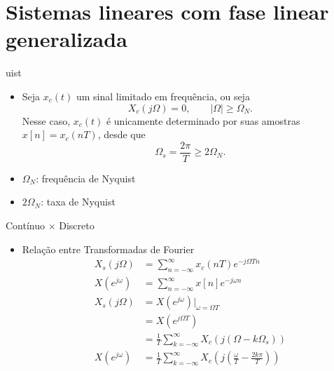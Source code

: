 \section{Sistemas lineares com fase linear generalizada}
\begin{slide}{uist}
\begin{itemize}
   \item Seja $x_c(t)$ um sinal limitado em frequ\^encia, ou seja
   \begin{equation}
       X_c(j\Omega) = 0, \qquad |\Omega|\geq\Omega_N.
   \end{equation}
   Nesse caso, $x_c(t)$ \'e unicamente determinado por suas amostras $x[n]=x_c(nT)$, desde que 
   \begin{equation}
       \Omega_s = \frac{2\pi}{T}\geq 2\Omega_N.
   \end{equation}
   \item $\Omega_N$: frequ\^encia de Nyquist
   \item $2\Omega_N$: taxa de Nyquist
\end{itemize}
\end{slide}

\begin{slide}{Contínuo $\times$ Discreto}
\begin{itemize}
   \item Rela\c c\~ao entre Transformadas de Fourier 
   \begin{align}
      X_s(j\Omega)   &= \sum_{n=-\infty}^{\infty}x_c(nT)e^{-j\Omega Tn}\\
      X(e^{j\omega}) &= \sum_{n=-\infty}^{\infty}x[n]e^{-j\omega n}\\
      X_s(j\Omega)   &= X(e^{j\omega})|_{\omega=\Omega T}\\
                     &= X(e^{j\Omega T}) \\
                     &= \frac{1}{T}\sum_{k=-\infty}^{\infty}X_c(j(\Omega-k\Omega_s))\\
     X(e^{j\omega})& = \frac{1}{T}\sum_{k=-\infty}^{\infty}X_c\left(j\left(\frac{\omega}{T}-\frac{2k\pi}{T}\right )\right )
   \end{align}
\end{itemize}
\end{slide}

